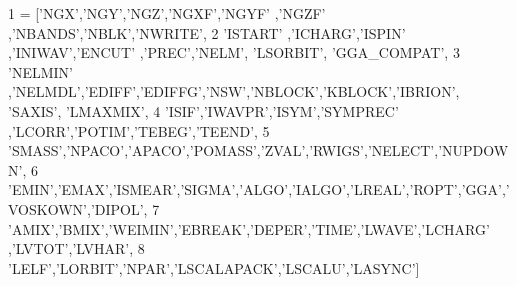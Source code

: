\begin{DoxyCode}
1 = [\textcolor{stringliteral}{'NGX'},\textcolor{stringliteral}{'NGY'},\textcolor{stringliteral}{'NGZ'},\textcolor{stringliteral}{'NGXF'},\textcolor{stringliteral}{'NGYF'} ,\textcolor{stringliteral}{'NGZF'} ,\textcolor{stringliteral}{'NBANDS'},\textcolor{stringliteral}{'NBLK'},\textcolor{stringliteral}{'NWRITE'}, 
2 \textcolor{stringliteral}{'ISTART'} ,\textcolor{stringliteral}{'ICHARG'},\textcolor{stringliteral}{'ISPIN'} ,\textcolor{stringliteral}{'INIWAV'},\textcolor{stringliteral}{'ENCUT'} ,\textcolor{stringliteral}{'PREC'},\textcolor{stringliteral}{'NELM'}, \textcolor{stringliteral}{'LSORBIT'}, \textcolor{stringliteral}{'GGA\_COMPAT'},
3 \textcolor{stringliteral}{'NELMIN'} ,\textcolor{stringliteral}{'NELMDL'},\textcolor{stringliteral}{'EDIFF'},\textcolor{stringliteral}{'EDIFFG'},\textcolor{stringliteral}{'NSW'},\textcolor{stringliteral}{'NBLOCK'},\textcolor{stringliteral}{'KBLOCK'},\textcolor{stringliteral}{'IBRION'}, \textcolor{stringliteral}{'SAXIS'}, \textcolor{stringliteral}{'LMAXMIX'},
4 \textcolor{stringliteral}{'ISIF'},\textcolor{stringliteral}{'IWAVPR'},\textcolor{stringliteral}{'ISYM'},\textcolor{stringliteral}{'SYMPREC'} ,\textcolor{stringliteral}{'LCORR'},\textcolor{stringliteral}{'POTIM'},\textcolor{stringliteral}{'TEBEG'},\textcolor{stringliteral}{'TEEND'}, 
5 \textcolor{stringliteral}{'SMASS'},\textcolor{stringliteral}{'NPACO'},\textcolor{stringliteral}{'APACO'},\textcolor{stringliteral}{'POMASS'},\textcolor{stringliteral}{'ZVAL'},\textcolor{stringliteral}{'RWIGS'},\textcolor{stringliteral}{'NELECT'},\textcolor{stringliteral}{'NUPDOWN'}, 
6 \textcolor{stringliteral}{'EMIN'},\textcolor{stringliteral}{'EMAX'},\textcolor{stringliteral}{'ISMEAR'},\textcolor{stringliteral}{'SIGMA'},\textcolor{stringliteral}{'ALGO'},\textcolor{stringliteral}{'IALGO'},\textcolor{stringliteral}{'LREAL'},\textcolor{stringliteral}{'ROPT'},\textcolor{stringliteral}{'GGA'},\textcolor{stringliteral}{'VOSKOWN'},\textcolor{stringliteral}{'DIPOL'}, 
7 \textcolor{stringliteral}{'AMIX'},\textcolor{stringliteral}{'BMIX'},\textcolor{stringliteral}{'WEIMIN'},\textcolor{stringliteral}{'EBREAK'},\textcolor{stringliteral}{'DEPER'},\textcolor{stringliteral}{'TIME'},\textcolor{stringliteral}{'LWAVE'},\textcolor{stringliteral}{'LCHARG'} ,\textcolor{stringliteral}{'LVTOT'},\textcolor{stringliteral}{'LVHAR'}, 
8 \textcolor{stringliteral}{'LELF'},\textcolor{stringliteral}{'LORBIT'},\textcolor{stringliteral}{'NPAR'},\textcolor{stringliteral}{'LSCALAPACK'},\textcolor{stringliteral}{'LSCALU'},\textcolor{stringliteral}{'LASYNC'}]
\end{DoxyCode}


